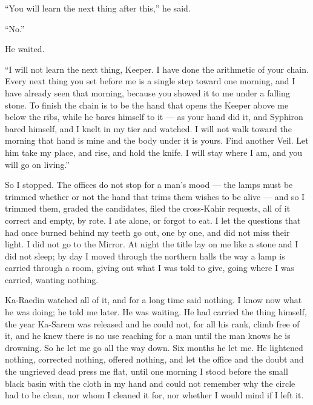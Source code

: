 ``You will learn the next thing after this,'' he said.\par

``No.''\par

He waited.\par

``I will not learn the next thing, Keeper. I have done the arithmetic of your chain. Every next thing you set before me is a single step toward one morning, and I have already seen that morning, because you showed it to me under a falling stone. To finish the chain is to be the hand that opens the Keeper above me below the ribs, while he bares himself to it --- as your hand did it, and Syphiron bared himself, and I knelt in my tier and watched. I will not walk toward the morning that hand is mine and the body under it is yours. Find another Veil. Let him take my place, and rise, and hold the knife. I will stay where I am, and you will go on living.''\par

So I stopped. The offices do not stop for a man's mood --- the lamps must be trimmed whether or not the hand that trims them wishes to be alive --- and so I trimmed them, graded the candidates, filed the cross-Kahir requests, all of it correct and empty, by rote. I ate alone, or forgot to eat. I let the questions that had once burned behind my teeth go out, one by one, and did not miss their light. I did not go to the Mirror. At night the title lay on me like a stone and I did not sleep; by day I moved through the northern halls the way a lamp is carried through a room, giving out what I was told to give, going where I was carried, wanting nothing. \par

Ka-Raedin watched all of it, and for a long time said nothing. I know now what he was doing; he told me later. He was waiting. He had carried the thing himself, the year Ka-Sarem was released and he could not, for all his rank, climb free of it, and he knew there is no use reaching for a man until the man knows he is drowning. So he let me go all the way down. Six months he let me. He lightened nothing, corrected nothing, offered nothing, and let the office and the doubt and the ungrieved dead press me flat, until one morning I stood before the small black basin with the cloth in my hand and could not remember why the circle had to be clean, nor whom I cleaned it for, nor whether I would mind if I left it.\par

